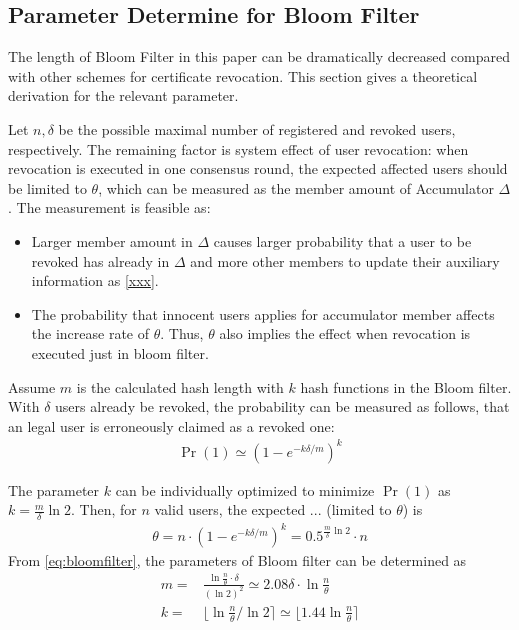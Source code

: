\documentclass[conference]{IEEEtran}
\begin{document}
\subsection{Parameter Determine for Bloom Filter}

The length of Bloom Filter in this paper can be dramatically decreased compared with other schemes for certificate revocation. This section gives a theoretical derivation for the relevant parameter.

Let $n, \delta$ be the possible maximal number of registered and revoked users, respectively. The remaining factor is system effect of user revocation: when revocation is executed in one consensus round, the expected affected users should be limited to $\theta$, which can be measured as the member amount of Accumulator $\Delta$. The measurement is feasible as:
\begin{itemize}
    \item Larger member amount in $\Delta$ causes larger probability that a user to be revoked has already in $\Delta$ and more other members to update their auxiliary information as \eqref{xxx}.
    \item The probability that innocent users applies for accumulator member affects the increase rate of $\theta$. Thus, $\theta$ also implies the effect when revocation is executed just in bloom filter.
\end{itemize}

Assume $m$ is the calculated hash length with $k$ hash functions in the Bloom filter. With $\delta$ users already be revoked, the probability can be measured as follows, that an legal user is erroneously claimed as a revoked one: 
\begin{align} 
    \Pr(1) \simeq (1 - e^{-k\delta/m})^k 
 \end{align}

The parameter $k$ can be individually optimized to minimize $\Pr(1)$ as $ k = \frac{m}{\delta}\ln 2$. Then, for $n$ valid users, the expected ... (limited to $\theta$) is 
\begin{align}\label{eq:bloomfilter}
    \theta = n \cdot (1 - e^{-k\delta/m})^{k} = 0.5^{\frac{m}{\delta}\ln 2}\cdot n
\end{align}
From \eqref{eq:bloomfilter}, the parameters of Bloom filter can be determined as 
\begin{align}
m = & \frac{\ln \frac{n}{\theta} \cdot \delta}{(\ln 2)^2} \simeq 2.08\delta \cdot\ln \frac{n}{\theta}\\
k = & \lfloor \ln \frac{n}{\theta} / \ln 2 \rceil \simeq \lfloor 1.44 \ln \frac{n}{\theta} \rceil
\end{align}
\end{document}
